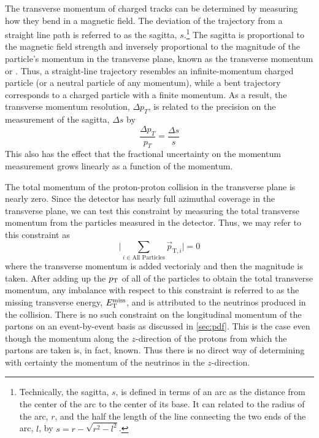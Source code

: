 The transverse momentum of charged tracks can be determined by measuring how they 
bend in a magnetic field. The deviation of the trajectory
from a straight line path is referred to as the 
sagitta, $s$.\footnote{Technically, the sagitta, $s$, is defined in terms
of an arc as the distance from the center of the arc to the center of its
base. It can related to the radius of the arc, $r$, and the half the length
of the line connecting the two ends of the arc, $l$, by 
$s=r-\sqrt{r^2-l^2}$.} The sagitta is proportional to the magnetic
field strength and inversely proportional to the magnitude
of the particle's momentum in the transverse plane, known
as the transverse momentum or \pt.
Thus, a straight-line trajectory resembles an infinite-momentum charged
particle (or a neutral particle of any momentum), while
a bent trajectory corresponds to a charged particle with a finite momentum.
As a result, the transverse momentum resolution, $\Delta p_T$, is related to the 
precision on the measurement of the sagitta, $\Delta s$ by
\begin{equation}
\frac{\Delta p_T }{p_T} = \frac{\Delta s}{s}
\label{eq:sagitta}
\end{equation}
This also has the effect that the fractional uncertainty on the momentum
measurement grows linearly as a function of the momentum.


The total momentum of the proton-proton collision in the transverse
plane is nearly zero. Since the detector has nearly full azimuthal coverage 
in the transverse plane, we can test this constraint by measuring
the total transverse momentum from the particles measured in the detector.
Thus, we may refer to this constraint as
\begin{equation}
\Bigg| \sum_{i\in\textrm{All Particles}} \vec{p}_{\textrm{T},i} \Bigg| = 0
\end{equation}
where the transverse momentum is added vectorialy and then
the magnitude is taken.
After adding up the $p_{\mathrm{T}}$ of all of the particles to obtain
the total transverse momentum, 
any imbalance with respect to this constraint
is referred to as the
missing transverse energy, $E_{\mathrm{T}}^{\mathrm{miss}}$, and is attributed to the 
neutrinos produced in the collision. 
There is no such constraint on the longitudinal momentum of the partons
on an event-by-event basis
as discussed in \sec\ref{sec:pdf}.
This is the case
even though the momentum along the $z$-direction of the 
protons from which the partons are taken is, in fact, known.
Thus there is no direct way of determining with certainty the 
momentum of the neutrinos in the $z$-direction.



